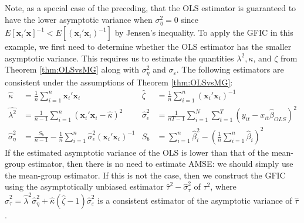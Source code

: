 Note, as a special case of the preceding, that the OLS estimator is guaranteed to have the lower asymptotic variance when $\sigma_{\eta}^2 = 0$ since $E[\mathbf{x}_i'\mathbf{x}]^{-1} < E[(\mathbf{x}_i'\mathbf{x}_i)^{-1}]$ by Jensen's inequality.
To apply the GFIC in this example, we first need to determine whether the OLS estimator has the smaller asymptotic variance.
This requires us to estimate the quantities $\lambda^2, \kappa$, and $\zeta$ from Theorem \ref{thm:OLSvsMG} along with $\sigma_{\eta}^2$ and $\sigma_{\varepsilon}$.
The following estimators are consistent under the assumptions of Theorem \ref{thm:OLSvsMG}:
\begin{align*}
  \widehat{\kappa} &= \frac{1}{n}\sum_{i=1}^n \mathbf{x}_i'\mathbf{x}_i &
  \widehat{\zeta} &= \frac{1}{n}\sum_{i=1}^n (\mathbf{x}_i'\mathbf{x}_i)^{-1} \\
  \widehat{\lambda^2} &= \frac{1}{n-1}\sum_{i=1}^n (\mathbf{x}_i'\mathbf{x}_i - \widehat{\kappa})^2  &
\widehat{\sigma}_\epsilon^2 &= \frac{1}{nT - 1} \sum_{i=1}^N \sum_{t=1}^T (y_{it}-x_{it}\widehat{\beta}_{OLS})^2\\
\widehat{\sigma}_\eta^2 &= \frac{S_b}{n-1} -\frac{1}{n} \sum_{i=1}^n \widehat{\sigma}_\epsilon^2 (\mathbf{x}_i'\mathbf{x}_i)^{-1} & 
S_b &= \sum_{i=1}^n \widehat{\beta}_i^2 - \left(\frac{1}{n} \sum_{i=1}^n \widehat{\beta}_i\right)^2 
\end{align*}
If the estimated asymptotic variance of the OLS is lower than that of the mean-group estimator, then there is no need to estimate AMSE: we should simply use the mean-group estimator.
If this is not the case, then we construct the GFIC using the asymptotically unbiased estimator $\widehat{\tau}^2 - \widehat{\sigma}_\tau^2$ of $\tau^2$, where $\widehat{\sigma}_\tau^2 = \widehat{\lambda}^2 \widehat{\sigma}^2_{\eta} + \widehat{\kappa}(\widehat{\zeta} - 1) \widehat{\sigma}_{\varepsilon}^2$ is a consistent estimator of the asymptotic variance of $\widehat{\tau}$.
